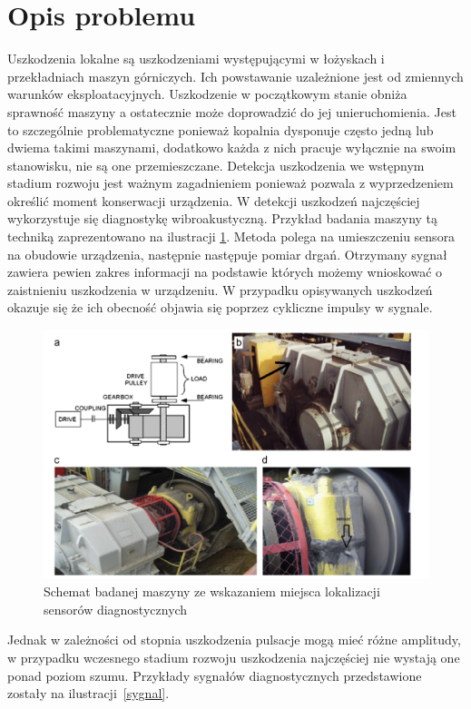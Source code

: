 \documentclass[inzynierska]{pwr_wmat_praca_dyplomowa}
\theoremstyle{plain}
\numberwithin{theorem}{chapter}
\theoremstyle{definition}
\numberwithin{theorem}{chapter}
\begin{document}
\section{Opis problemu}
Uszkodzenia lokalne są uszkodzeniami występującymi w łożyskach i przekładniach maszyn górniczych. Ich powstawanie uzależnione jest od zmiennych warunków eksploatacyjnych\cite{adaptacyjne}. Uszkodzenie w początkowym stanie obniża sprawność maszyny a ostatecznie może doprowadzić do jej unieruchomienia. Jest to szczególnie problematyczne ponieważ kopalnia dysponuje często jedną lub dwiema takimi maszynami, dodatkowo każda z nich pracuje wyłącznie na swoim stanowisku, nie są one przemieszczane.
 Detekcja uszkodzenia we wstępnym stadium rozwoju jest ważnym zagadnieniem ponieważ pozwala z wyprzedzeniem określić moment konserwacji urządzenia. W detekcji uszkodzeń najczęściej wykorzystuje się diagnostykę wibroakustyczną. Przykład badania maszyny tą techniką zaprezentowano na ilustracji \ref{sensory}. Metoda polega na umieszczeniu sensora na obudowie urządzenia, następnie następuje pomiar drgań. Otrzymany sygnał zawiera pewien zakres informacji na podstawie których możemy wnioskować o zaistnieniu uszkodzenia w urządzeniu. W przypadku opisywanych uszkodzeń okazuje się że ich obecność objawia się poprzez cykliczne impulsy w sygnale.
\begin{figure}[ht]

\centering
                     
\includegraphics[scale=0.5]{images/sensors.png}
\caption{Schemat badanej maszyny ze wskazaniem miejsca lokalizacji sensorów diagnostycznych}
\label{sensory}
\end{figure}
Jednak w zależności od stopnia uszkodzenia pulsacje mogą mieć różne amplitudy, w przypadku wczesnego stadium rozwoju uszkodzenia najczęściej nie wystają one ponad poziom szumu. Przykłady sygnałów diagnostycznych przedstawione zostały na ilustracji~\ref{sygnal}.
\end{document}
